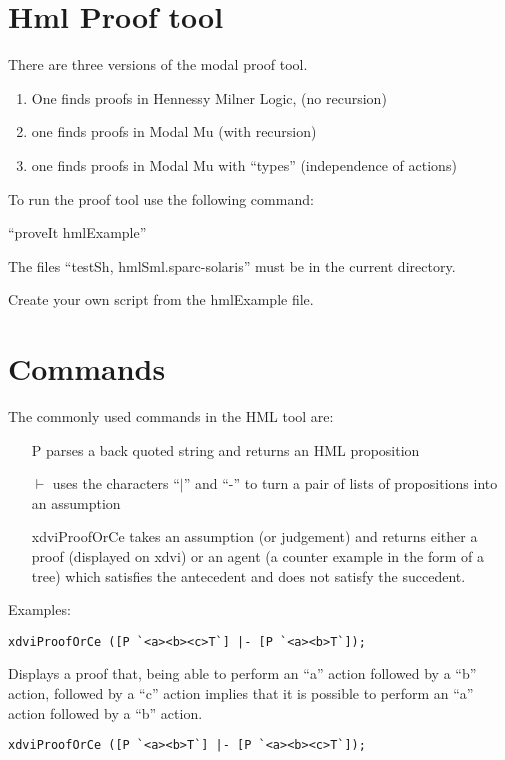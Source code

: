 \documentclass[12pt]{article}
\begin{document}
\section{Hml Proof tool}
There are three versions of the modal proof tool.
\begin{enumerate}
\item One finds proofs in Hennessy Milner Logic, (no recursion)
\item one finds proofs in Modal Mu (with recursion)
\item one finds proofs in Modal Mu with ``types'' (independence of actions)
\end{enumerate}

To run the proof tool use the following command:

``proveIt hmlExample''

The files ``testSh, hmlSml.sparc-solaris'' must be in the current directory.

Create your own script from the hmlExample file.




\section{Commands}
The commonly used commands in the HML tool are:

\begin{itemize}
\item[P] parses a back quoted string and returns an HML proposition
\item[$\vdash$] uses the characters ``$\mid$'' and ``-'' to 
      turn a pair of lists of propositions into an assumption
\item[xdviProofOrCe] takes an assumption (or judgement) and returns
     either a proof (displayed on xdvi) or an agent (a counter example
     in the form of a tree) which satisfies the antecedent
     and does not satisfy the succedent.
\end{itemize}

Examples:

\begin{verbatim}
xdviProofOrCe ([P `<a><b><c>T`] |- [P `<a><b>T`]);
\end{verbatim}

Displays a proof that, being able to perform an ``a'' action followed by
a ``b'' action, followed by a ``c'' action implies that it is possible to
perform an ``a'' action followed by a ``b'' action.

\begin{verbatim}
xdviProofOrCe ([P `<a><b>T`] |- [P `<a><b><c>T`]);
\end{verbatim}
\end{document}
